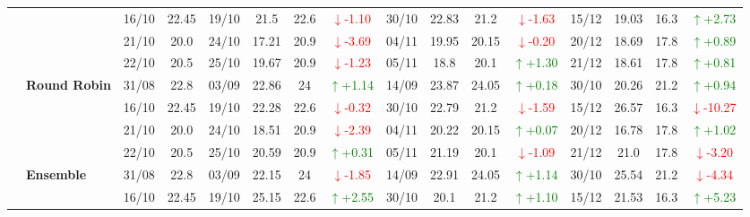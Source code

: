 \documentclass{ieeeaccess}
\begin{document}
{\begin{longtable}{llcc|cccc|cccc|cccc}
& 
& 16/10 & 22.45 & 19/10 & 21.5 & 22.6 & \textcolor{red}{\(\downarrow\)-1.10} & 30/10 & 22.83 & 21.2 & \textcolor{red}{\(\downarrow\)-1.63} & 15/12 & 19.03 & 16.3 & \textcolor{green}{\(\uparrow\)+2.73} \\

& 
& 21/10 & 20.0 & 24/10 & 17.21 & 20.9 & \textcolor{red}{\(\downarrow\)-3.69} & 04/11 & 19.95 & 20.15 & \textcolor{red}{\(\downarrow\)-0.20} & 20/12 & 18.69 & 17.8 & \textcolor{green}{\(\uparrow\)+0.89} \\

&
& 22/10 & 20.5 & 25/10 & 19.67 & 20.9 & \textcolor{red}{\(\downarrow\)-1.23} & 05/11 & 18.8 & 20.1 & \textcolor{green}{\(\uparrow\)+1.30} & 21/12 & 18.61 & 17.8 & \textcolor{green}{\(\uparrow\)+0.81} \\
\cmidrule(lr){2-16}


& \textbf{Round Robin}
& 31/08 & 22.8 & 03/09 & 22.86 & 24 & \textcolor{green}{\(\uparrow\)+1.14} & 14/09 & 23.87 & 24.05 & \textcolor{green}{\(\uparrow\)+0.18} & 30/10 & 20.26 & 21.2 & \textcolor{green}{\(\uparrow\)+0.94} \\

&
& 16/10 & 22.45 & 19/10 & 22.28 & 22.6 & \textcolor{red}{\(\downarrow\)-0.32} & 30/10 & 22.79 & 21.2 & \textcolor{red}{\(\downarrow\)-1.59} & 15/12 & 26.57 & 16.3 & \textcolor{red}{\(\downarrow\)-10.27} \\

&
& 21/10 & 20.0 & 24/10 & 18.51 & 20.9 & \textcolor{red}{\(\downarrow\)-2.39} & 04/11 & 20.22 & 20.15 & \textcolor{green}{\(\uparrow\)+0.07} & 20/12 & 16.78 & 17.8 & \textcolor{green}{\(\uparrow\)+1.02} \\

&
& 22/10 & 20.5 & 25/10 & 20.59 & 20.9 & \textcolor{green}{\(\uparrow\)+0.31} & 05/11 & 21.19 & 20.1 & \textcolor{red}{\(\downarrow\)-1.09} & 21/12 & 21.0 & 17.8 & \textcolor{red}{\(\downarrow\)-3.20} \\
\cmidrule(lr){2-16}


& \textbf{Ensemble}
& 31/08 & 22.8 & 03/09 & 22.15 & 24 & \textcolor{red}{\(\downarrow\)-1.85} & 14/09 & 22.91 & 24.05 & \textcolor{green}{\(\uparrow\)+1.14} & 30/10 & 25.54 & 21.2 & \textcolor{red}{\(\downarrow\)-4.34} \\

&
& 16/10 & 22.45 & 19/10 & 25.15 & 22.6 & \textcolor{green}{\(\uparrow\)+2.55} & 30/10 & 20.1 & 21.2 & \textcolor{green}{\(\uparrow\)+1.10} & 15/12 & 21.53 & 16.3 & \textcolor{green}{\(\uparrow\)+5.23} \\


\end{longtable}}
\end{document}
